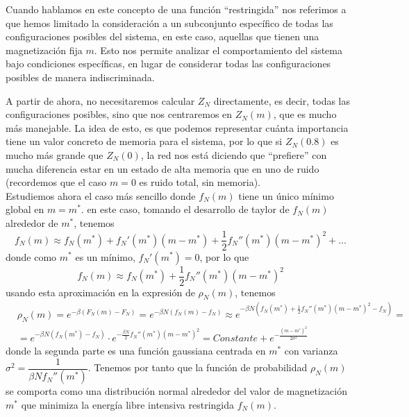 \begin{observacion}
    Cuando hablamos en este concepto de una función ``restringida'' nos referimos a que hemos limitado la consideración a un subconjunto específico de todas las configuraciones posibles del sistema, en este caso, aquellas que tienen una magnetización fija $m$. Esto nos permite analizar el comportamiento del sistema bajo condiciones específicas, en lugar de considerar todas las configuraciones posibles de manera indiscriminada.
\end{observacion}

\noindent
A partir de ahora, no necesitaremos calcular $Z_N$ directamente, es decir, todas las configuraciones posibles, sino que nos centraremos en $Z_N(m)$, que es mucho más manejable. La idea de esto, es que podemos representar cuánta importancia tiene un valor concreto de memoria para el sistema, por lo que si $Z_N(0.8)$ es mucho más grande que $Z_N(0)$, la red nos está diciendo que ``prefiere'' con mucha diferencia estar en un estado de alta memoria que en uno de ruido (recordemos que el caso $m=0$ es ruido total, sin memoria). \\

\noindent
Estudiemos ahora el caso más sencillo donde $f_N(m)$ tiene un único mínimo global en $m=m^*$. en este caso, tomando el desarrollo de taylor de $f_N(m)$ alrededor de $m^*$, tenemos
\begin{equation*}
    f_N(m) \approx f_N(m^*) + f_N'(m^*)(m - m^*) + \frac{1}{2} f_N''(m^*)(m - m^*)^2 + \dots
\end{equation*}
donde como $m^*$ es un mínimo, $f_N'(m^*) = 0$, por lo que
\begin{equation*}
    f_N(m) \approx f_N(m^*) + \frac{1}{2} f_N''(m^*)(m - m^*)^2
\end{equation*}
usando esta aproximación en la expresión de $\rho_N(m)$, tenemos
\begin{align*}
    &\rho_N(m) = e^{-\beta (F_N(m) - F_N)}=e^{-\beta N (f_N(m) - f_N)} \approx e^{-\beta N \left( f_N(m^*) + \frac{1}{2} f_N''(m^*)(m - m^*)^2 - f_N \right)} = \\
    &= e^{-\beta N (f_N(m^*) - f_N)} \cdot e^{-\frac{\beta N}{2}f_N''(m^*)(m - m^*)^2}=Constante + e^{-\frac{(m - m^*)^2}{2\sigma^2}}
\end{align*}
donde la segunda parte es una función gaussiana centrada en $m^*$ con varianza $\sigma^2 = \dfrac{1}{\beta N f_N''(m^*)}$. Tenemos por tanto que la función de probabilidad $\rho_N(m)$ se comporta como una distribución normal alrededor del valor de magnetización $m^*$ que minimiza la energía libre intensiva restringida $f_N(m)$. \\


